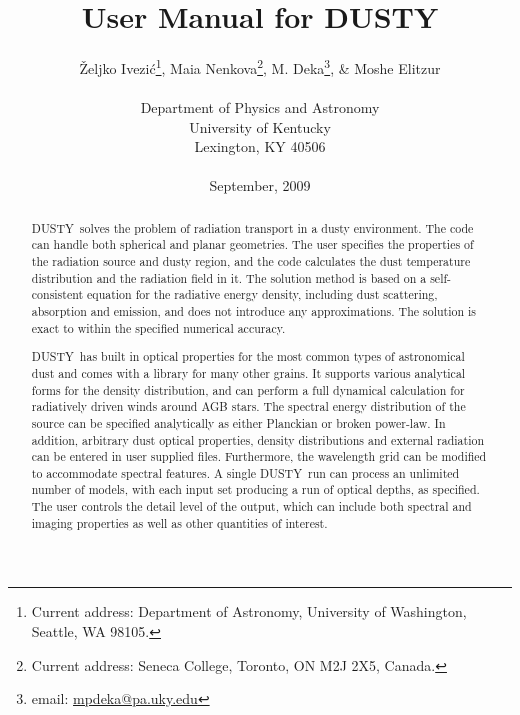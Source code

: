 \documentclass[11pt]{article}
\def\D  {{\sf DUSTY}}
\def\Ivezic {Ivezi\'c}
\begin{document}
\title{User Manual for DUSTY}

\author{\v Zeljko \Ivezic\footnote{Current address: Department of Astronomy, 
  University of Washington, Seattle, WA 98105.}, 
  Maia Nenkova\footnote{Current address: Seneca College, Toronto, ON M2J 2X5, Canada.}, 
  M. Deka\footnote{email: \href{mpdeka@pa.uky.edu}{mpdeka@pa.uky.edu}}, 
  \& Moshe Elitzur\\
  \\Department of Physics and Astronomy\\ 
  University of Kentucky\\
  Lexington, KY 40506\\
  \\September, 2009
}
\date{}

\maketitle
\thispagestyle{empty}

\vfil
\begin{abstract}

{\D\ solves the problem of radiation transport in a dusty environment. The code
can handle both spherical and planar geometries. The user specifies the
properties of the radiation source and dusty region, and the code calculates
the dust temperature distribution and the radiation field in it. The solution
method is based on a self-consistent equation for the radiative energy density,
including dust scattering, absorption and emission, and does not introduce any
approximations. The solution is exact to within the specified numerical
accuracy.

\D\ has built in optical properties for the most common types of astronomical
dust and comes with a library for many other grains. It supports various
analytical forms for the density distribution, and can perform a full dynamical
calculation for radiatively driven winds around AGB stars. The spectral energy
distribution of the source can be specified analytically as either Planckian or
broken power-law. In addition, arbitrary dust optical properties, density
distributions and external radiation can be entered in user supplied files.
Furthermore, the wavelength grid can be modified to accommodate spectral
features.  A single \D\ run can process an unlimited number of models, with
each input set producing a run of optical depths, as specified. The user
controls the detail level of the output, which can include both spectral and
imaging properties as well as other quantities of interest.}

\end{abstract}
\end{document}
